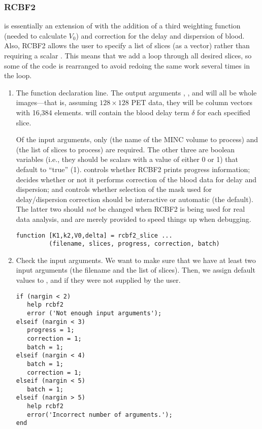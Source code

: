 \subsubsection{RCBF2}
\label{sec:rcbf2_listing}

 is essentially an extension of  with the
addition of a third weighting function (needed to calculate $V_0$) and
correction for the delay and dispersion of blood.  Also, RCBF2
allows the user to specify a list of slices (as a vector) rather than
requiring a scalar .  This means that we add a loop
through all desired slices, so some of the code is rearranged to avoid
redoing the same work several times in the loop.

\begin{enumerate}
\item The function declaration line.  The output arguments ,
  , and  will all be whole images---that is,
  assuming $128 \times 128$ PET data, they will be column vectors with
  16,384 elements.   will contain the blood delay term
  $\delta$ for each specified slice.

  Of the input arguments, only  (the name of the MINC
  volume to process) and  (the list of slices to process)
  are required.  The other three are boolean variables (i.e., they
  should be scalars with a value of either 0 or 1) that default to
  ``true'' (1).   controls whether RCBF2 prints
  progress information;  decides whether or not it
  performs correction of the blood data for delay and dispersion; and
   controls whether selection of the mask used for
  delay/dispersion correction should be interactive or automatic (the
  default).  The latter two should {\em not} be changed when RCBF2 is
  being used for real data analysis, and are merely provided to speed
  things up when debugging.
  \begin{verbatim}
function [K1,k2,V0,delta] = rcbf2_slice ...
         (filename, slices, progress, correction, batch)
  \end{verbatim}

\item Check the input arguments.  We want to make sure that we have at
  least two input arguments (the filename and the list of slices).
  Then, we assign default values to , 
  and  if they were not supplied by the user.
\begin{verbatim}
if (nargin < 2)
   help rcbf2
   error ('Not enough input arguments');
elseif (nargin < 3)
   progress = 1;
   correction = 1;
   batch = 1;   
elseif (nargin < 4)
   batch = 1;
   correction = 1;
elseif (nargin < 5)
   batch = 1;
elseif (nargin > 5)
   help rcbf2
   error('Incorrect number of arguments.');
end
\end{verbatim}


\end{enumerate}
